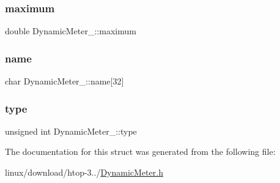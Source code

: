 \mbox{\label{structDynamicMeter___a7688befda7e4e4adae67c6fc2e9ae269}} 
\subsubsection{\texorpdfstring{maximum}{maximum}}
{\footnotesize\ttfamily double Dynamic\+Meter\+\_\+\+::maximum}

\mbox{\label{structDynamicMeter___a53b14f6bfe02476fcb9e93ba0080a72f}} 
\subsubsection{\texorpdfstring{name}{name}}
{\footnotesize\ttfamily char Dynamic\+Meter\+\_\+\+::name\mbox{[}32\mbox{]}}

\mbox{\label{structDynamicMeter___ab37137e8dfb6b9d185102e2bc8fa9182}} 
\subsubsection{\texorpdfstring{type}{type}}
{\footnotesize\ttfamily unsigned int Dynamic\+Meter\+\_\+\+::type}



The documentation for this struct was generated from the following file\+:\begin{DoxyCompactItemize}
\item 
linux/download/htop-\/3../\hyperlink{DynamicMeter_8h}{Dynamic\+Meter.\+h}\end{DoxyCompactItemize}
